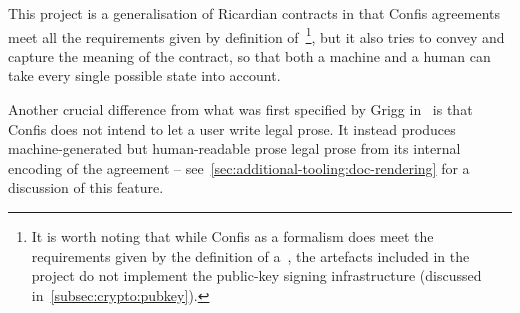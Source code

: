 This project is a generalisation of Ricardian contracts in that Confis agreements meet all the requirements given by definition of~\footnote{It is worth noting that while Confis as a formalism does meet the requirements given by the definition of a~, the artefacts included in the project do not implement the public-key signing infrastructure (discussed in~\autoref{subsec:crypto:pubkey}).}, but it also tries to convey and capture the meaning of the contract, so that both a machine and a human can take every single possible state into account.

Another crucial difference from what was first specified by Grigg in~\cite{grigg2004ricardian} is that Confis does not intend to let a user write legal prose.
It instead produces machine-generated but human-readable prose legal prose from its internal encoding of the agreement -- see~\autoref{sec:additional-tooling:doc-rendering} for a discussion of this feature.
